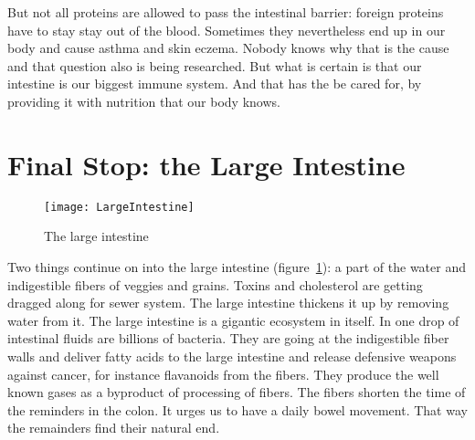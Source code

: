 \documentclass[../main.tex]{subfiles}
\begin{document}
But not all proteins are allowed to pass the intestinal barrier: foreign proteins have to stay stay out of the blood.
Sometimes they nevertheless end up in our body and cause asthma and skin eczema.
Nobody knows why that is the cause and that question also is being researched.
But what is certain is that our intestine is our biggest immune system.
And that has the be cared for, by providing it with nutrition that our body knows.

\section{Final Stop: the Large Intestine}

    \begin{figure}[htb!]
    \begin{center}
  \texttt{[image: LargeIntestine]}
  \caption{The large intestine~\cite{BlausenLimbic}}\label{LargeIntestine}
  \end{center}
  \end{figure}


  Two things continue on into the large intestine (figure~\ref{LargeIntestine}):
  a part of the water and indigestible fibers of veggies and grains. 
Toxins and cholesterol are getting dragged along for sewer system.
The large intestine thickens it up by removing water from it.
The large intestine is a gigantic ecosystem in itself.
In one drop of intestinal fluids are billions of bacteria.
They are going at the indigestible fiber walls and deliver fatty acids to the large intestine
and release defensive weapons against cancer, for instance flavanoids from the fibers.
They produce the well known gases as a byproduct of processing of fibers.
The fibers shorten the time of the reminders in the colon.
It urges us to have a daily bowel movement.
That way the remainders find their natural end.
\end{document}
